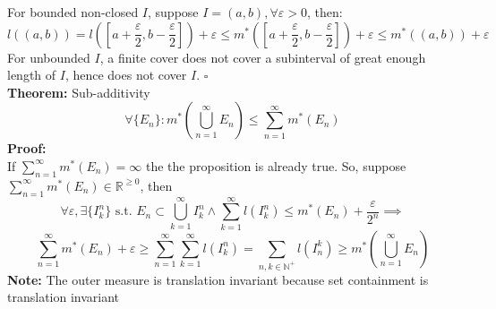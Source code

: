 \documentclass{article}
\newcommand{\R}{\mathbb{R}}
\newcommand{\N}{\mathbb{N}}
\newcommand{\sumninf}{\displaystyle\sum_{n=1}^\infty}
\newcommand{\infcup}{\displaystyle\bigcup_{n=1}^\infty}
\newcommand{\st}{\mbox{ s.t. }}
\newcommand{\0}{{\bf{0}}}
\newcommand{\1}{{\bf{1}}}
\begin{document}
For bounded non-closed $I$, suppose $I=(a,b),\forall\varepsilon>0$, then:
$$l((a,b))=l\left(\left[a+\dfrac{\varepsilon}{2},b-\dfrac{\varepsilon}{2}\right]\right)+\varepsilon\le m^*\left(\left[a+\dfrac{\varepsilon}{2},b-\dfrac{\varepsilon}{2}\right]\right)+\varepsilon\le m^*((a,b))+\varepsilon$$
For unbounded $I$, a finite cover does not cover a subinterval of great enough length of $I$, hence does not cover $I$. $\square$\\
\textbf{Theorem:} Sub-additivity
$$\forall \{E_n\}:m^*\left(\infcup E_n\right)\le\sumninf m^*(E_n)$$
\textbf{Proof:}\\
If $\sumninf m^*(E_n)=\infty$ the the proposition is already true. So, suppose $\sumninf m^*(E_n)\in\R^{\geq0}$, then
$$\forall\varepsilon,\exists\{I_k^n\}\st E_n\subset\bigcup_{k=1}^\infty I_k^n\land\sum_{k=1}^\infty l(I_k^n)\le m^*(E_n)+\frac{\varepsilon}{2^n}\implies$$
$$\sumninf m^*(E_n)+\varepsilon\geq\sumninf\sum_{k=1}^\infty l(I_k^n)=\sum_{n,k\in\N^+}l(I_n^k)\geq m^*\left(\infcup E_n\right)$$
\textbf{Note:} The outer measure is translation invariant because set containment is translation invariant
\end{document}

